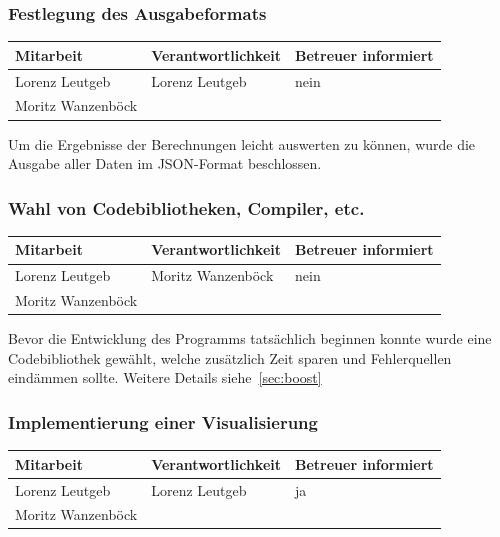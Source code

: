 \subsubsection{ Festlegung des Ausgabeformats}

\begin{center}
\begin{tabular}{lll}
	Mitarbeit & Verantwortlichkeit & Betreuer informiert \\
	\hline
	Lorenz Leutgeb & Lorenz Leutgeb & nein \\
	Moritz Wanzenböck & & \\
\end{tabular}
\end{center}

Um die Ergebnisse der Berechnungen leicht auswerten zu können, wurde die Ausgabe aller Daten im JSON-Format beschlossen.

\subsubsection{ Wahl von Codebibliotheken, Compiler, etc.}

\begin{center}
\begin{tabular}{lll}
	Mitarbeit & Verantwortlichkeit & Betreuer informiert \\
	\hline
	Lorenz Leutgeb & Moritz Wanzenböck & nein \\
	Moritz Wanzenböck & & \\
\end{tabular}
\end{center}

Bevor die Entwicklung des Programms tatsächlich beginnen konnte wurde eine Code\-bi\-bli\-othek gewählt, welche zusätzlich Zeit sparen und Fehlerquellen eindämmen sollte. Weitere Details siehe~\ref{sec:boost}

\subsubsection{ Implementierung einer Visualisierung}

\begin{center}
\begin{tabular}{lll}
	Mitarbeit & Verantwortlichkeit & Betreuer informiert \\
	\hline
	Lorenz Leutgeb & Lorenz Leutgeb & ja \\
	Moritz Wanzenböck & & \\
\end{tabular}
\end{center}

